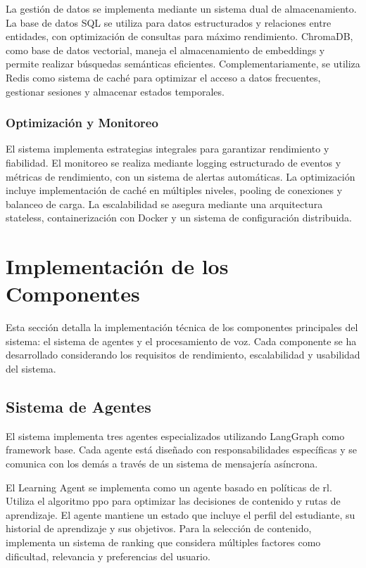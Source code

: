 La gestión de datos se implementa mediante un sistema dual de almacenamiento. La base de datos SQL se utiliza para datos estructurados y relaciones entre entidades, con optimización de consultas para máximo rendimiento. ChromaDB, como base de datos vectorial, maneja el almacenamiento de embeddings y permite realizar búsquedas semánticas eficientes. Complementariamente, se utiliza Redis como sistema de caché para optimizar el acceso a datos frecuentes, gestionar sesiones y almacenar estados temporales.

\subsubsection{Optimización y Monitoreo}
\label{optimizacion-monitoreo}

El sistema implementa estrategias integrales para garantizar rendimiento y fiabilidad. El monitoreo se realiza mediante logging estructurado de eventos y métricas de rendimiento, con un sistema de alertas automáticas. La optimización incluye implementación de caché en múltiples niveles, pooling de conexiones y balanceo de carga. La escalabilidad se asegura mediante una arquitectura stateless, containerización con Docker y un sistema de configuración distribuida.


\section{Implementación de los Componentes}
\label{implementacion-componentes}

Esta sección detalla la implementación técnica de los componentes principales del sistema: el sistema de agentes y el procesamiento de voz. Cada componente se ha desarrollado considerando los requisitos de rendimiento, escalabilidad y usabilidad del sistema.

\subsection{Sistema de Agentes}
\label{implementacion-agentes}

El sistema implementa tres agentes especializados utilizando LangGraph como framework base. Cada agente está diseñado con responsabilidades específicas y se comunica con los demás a través de un sistema de mensajería asíncrona.

El Learning Agent se implementa como un agente basado en políticas de \gls{rl}. Utiliza el algoritmo \gls{ppo} para optimizar las decisiones de contenido y rutas de aprendizaje. El agente mantiene un estado que incluye el perfil del estudiante, su historial de aprendizaje y sus objetivos. Para la selección de contenido, implementa un sistema de ranking que considera múltiples factores como dificultad, relevancia y preferencias del usuario.

